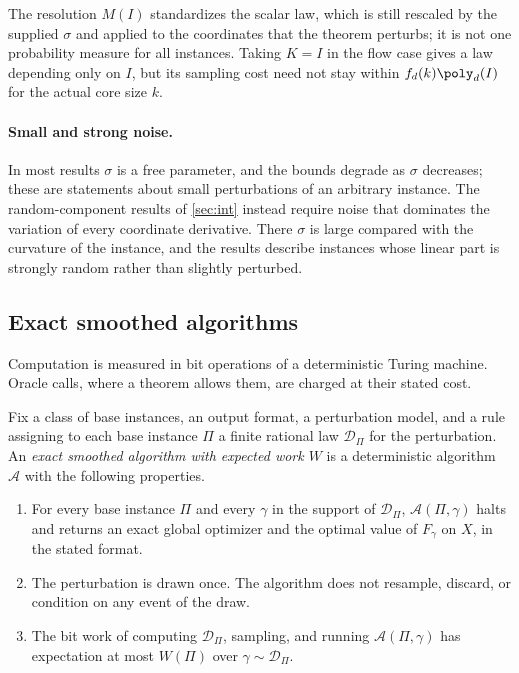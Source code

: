 The resolution $M(I)$ standardizes the scalar law, which is still rescaled
by the supplied $\sigma$ and applied to the coordinates that the theorem
perturbs; it is not one probability measure for all instances. Taking
$K=I$ in the flow case gives a law depending only on $I$, but its sampling
cost need not stay within $f_d(k)\poly_d(I)$ for the actual core size $k$.

\paragraph{Small and strong noise.}
In most results $\sigma$ is a free parameter, and the bounds degrade as
$\sigma$ decreases; these are statements about small perturbations of an
arbitrary instance. The random-component results of \cref{sec:int} instead
require noise that dominates the variation of every coordinate derivative.
There $\sigma$ is large compared with the curvature of the instance, and the
results describe instances whose linear part is strongly random rather than
slightly perturbed.

\subsection{Exact smoothed algorithms}\label{sec:model:algorithms}

Computation is measured in bit operations of a deterministic Turing
machine. Oracle calls, where a theorem allows them, are charged at their
stated cost.

\begin{definition}\label{def:model:algorithm}
Fix a class of base instances, an output format, a perturbation model, and a
rule assigning to each base instance $\Pi$ a finite rational law
$\mathcal D_\Pi$ for the perturbation. An \emph{exact smoothed algorithm with
expected work $W$} is a deterministic algorithm $\mathcal A$ with the
following properties.
\begin{enumerate}[label=(\roman*)]
\item\label{it:model:every} For every base instance $\Pi$ and every $\gamma$
in the support of $\mathcal D_\Pi$, $\mathcal A(\Pi,\gamma)$ halts and
returns an exact global optimizer and the optimal value of $F_\gamma$ on $X$,
in the stated format.
\item\label{it:model:once} The perturbation is drawn once. The algorithm
does not resample, discard, or condition on any event of the draw.
\item\label{it:model:expect} The bit work of computing $\mathcal D_\Pi$,
sampling, and running $\mathcal A(\Pi,\gamma)$ has expectation at most
$W(\Pi)$ over $\gamma\sim\mathcal D_\Pi$.
\end{enumerate}
\end{definition}

